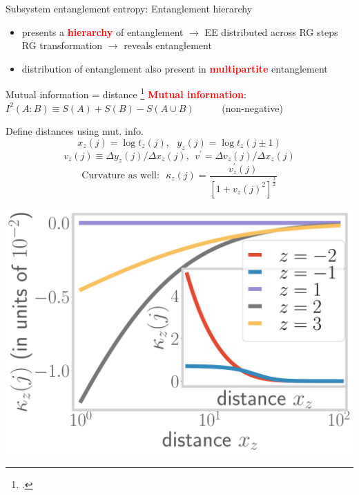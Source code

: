 \documentclass[11pt,aspectratio=169]{beamer}
\newcommand{\focus}[1]{\textcolor{red}{\bf{#1}}}
\begin{document}
\begin{frame}{Subsystem entanglement entropy: Entanglement hierarchy}
\vspace*{\fill}

\begin{itemize}
	\item 
presents a \focus{hierarchy} of entanglement \(\longrightarrow\) EE distributed across RG steps\\
RG transformation \(\longrightarrow\) reveals entanglement

\vspace*{\fill}
\item distribution of entanglement also present in \focus{multipartite} entanglement
\end{itemize}

\end{frame}

\begin{frame}{Mutual information = distance}
\footcite{van2010building,lee2016,anirban_mott_2022,lee2010,lee2014,qi2013,lee2016,anirbanurg1,anirbanurg2,ryu2006,ryu2006aspects,nozaki2012}
\focus{Mutual information}: ~ \(I^2(A:B) \equiv S(A) + S(B) - S(A \cup B)\) ~ ~ ~ (non-negative)\\[10pt]

	\begin{minipage}{0.5\textwidth}
	Define distances using mut. info.
	\[x_z(j) = \log t_z(j),~ ~ ~y_z(j) = \log t_z(j \pm 1)\]
	\[v_z(j) \equiv \Delta y_z(j)/\Delta x_z(j), ~~ v^\prime = \Delta v_z(j)/\Delta x_z(j)\]
	\[\text{Curvature as well:} ~ ~ ~\kappa_{z}(j) = \frac{v^\prime_z(j)}{\left[1 + v_z(j)^2\right]^\frac{3}{2}}\]
	\end{minipage}
	\begin{minipage}{0.49\textwidth}
		\includegraphics[width=\textwidth]{curvature-pos.pdf}
	\end{minipage}
\end{frame}
\end{document}
